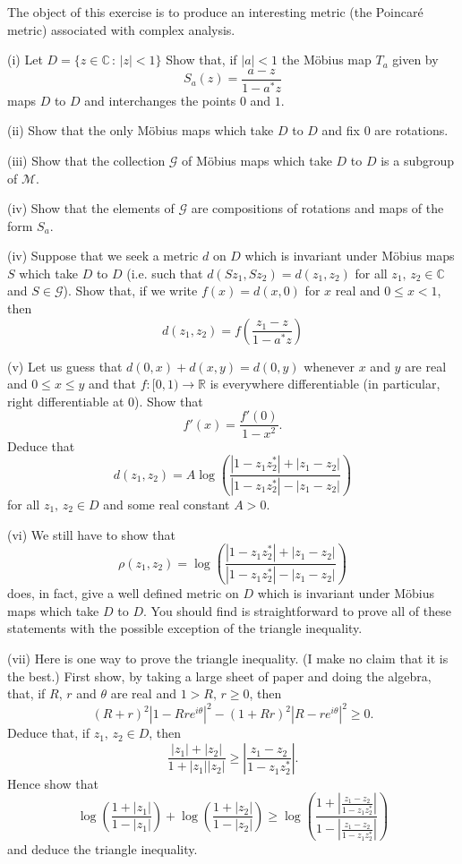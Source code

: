 \begin{exercise}\label{E;hyperbolic}
The object of this exercise is to produce an interesting metric
(the Poincar\'{e} metric) associated with complex analysis.

(i) Let $D=\{z\in{\mathbb C}\,:\,|z|<1\}$ Show that, if $|a|<1$
the M\"{o}bius map $T_{a}$ given by
\[S_{a}(z)=\frac{a-z}{1-a^{*}z}\]
maps $D$ to $D$ and interchanges the points $0$ and $1$.

(ii) Show that the only M\"{o}bius maps which take $D$ to $D$
and fix $0$ are rotations.

(iii) Show that the collection ${\mathcal G}$ of
M\"{o}bius maps which take $D$ to $D$ is a subgroup of ${\mathcal M}$.

(iv) Show that the elements of ${\mathcal G}$
are compositions of rotations and maps of the form $S_{a}$.

(iv) Suppose that we seek a metric $d$ on $D$ which is invariant
under M\"{o}bius maps $S$ which take $D$ to $D$
(i.e. such that $d(Sz_{1},Sz_{2})=d(z_{1},z_{2})$
for all $z_{1},\,z_{2}\in {\mathbb C}$
and $S\in {\mathcal G}$). Show that, if we write
$f(x)=d(x,0)$ for $x$ real and $0\leq x<1$, then
\[d(z_{1},z_{2})=f\left(\frac{z_{1}-z}{1-a^{*}z}\right)\]

(v) Let us guess that $d(0,x)+d(x,y)=d(0,y)$ whenever $x$ and $y$
are real and $0\leq x\leq y$ and that $f:[0,1)\rightarrow{\mathbb R}$
is everywhere differentiable (in particular, right differentiable at $0$).
Show that
\[f'(x)=\frac{f'(0)}{1-x^{2}}.\]
Deduce that
\[d(z_{1},z_{2})=A\log\left(
\frac{|1-z_{1}z_{2}^{*}|+|z_{1}-z_{2}|}{|1-z_{1}z_{2}^{*}|-|z_{1}-z_{2}|}
\right)\]
for all $z_{1},\,z_{2}\in D$ and some real constant $A>0$.

(vi) We still have to show that
\[
\rho(z_{1},z_{2})=\log\left(
\frac{|1-z_{1}z_{2}^{*}|+|z_{1}-z_{2}|}{|1-z_{1}z_{2}^{*}|-|z_{1}-z_{2}|}
\right)\]
does, in fact, give a well defined metric on $D$ which is invariant under
M\"{o}bius maps which take $D$ to $D$.
You should find is straightforward to prove all of these
statements with the possible exception of the triangle inequality.

(vii) Here is one way to prove the triangle inequality.
(I make no claim that it is the best.) First show, by
taking a large sheet of paper and doing the algebra, that,
if $R$, $r$ and $\theta$ are real and $1>R,\,r\geq 0$,
then
\[(R+r)^{2}|1-Rre^{i\theta}|^{2}-
(1+Rr)^{2}|R-re^{i\theta}|^{2}\geq 0.\]
Deduce that, if $z_{1},\,z_{2}\in D$, then
\[\frac{|z_{1}|+|z_{2}|}{1+|z_{1}||z_{2}|}
\geq \left|\frac{z_{1}-z_{2}}{1-z_{1}z_{2}^{*}}\right|.\]
Hence show that
\[\log\left(\frac{1+|z_{1}|}{1-|z_{1}|}\right)
+\log\left(\frac{1+|z_{2}|}{1-|z_{2}|}\right)
\geq\log\left(\frac{1+
\left|\frac{z_{1}-z_{2}}{1-z_{1}z_{2}^{*}}\right|}
{1-\left|\frac{z_{1}-z_{2}}{1-z_{1}z_{2}^{*}}\right|}\right)\]
and deduce the triangle inequality.


\end{exercise}
